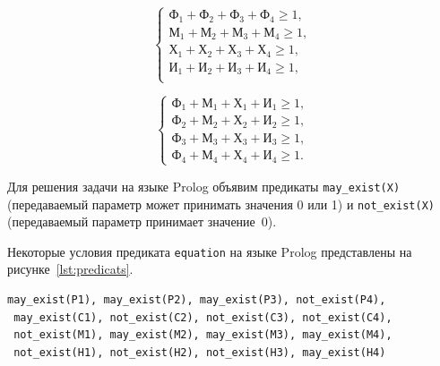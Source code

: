 \begin{minipage}[h!]{0.45\linewidth}
  \begin{equation*}
    \left\{
      \begin{aligned}
        \texttt{Ф}_1 + \texttt{Ф}_2 + \texttt{Ф}_3 + \texttt{Ф}_4 \ge 1, \\
        \texttt{М}_1 + \texttt{М}_2 + \texttt{М}_3 + \texttt{М}_4 \ge 1, \\
        \texttt{Х}_1 + \texttt{Х}_2 + \texttt{Х}_3 + \texttt{Х}_4 \ge 1, \\
        \texttt{И}_1 + \texttt{И}_2 + \texttt{И}_3 + \texttt{И}_4 \ge 1, \\
      \end{aligned}
    \right.
  \end{equation*}
\end{minipage}
\hfill
\begin{minipage}[h!]{0.45\linewidth}
  \begin{equation*}
    \left\{
      \begin{aligned}
        \texttt{Ф}_1 + \texttt{М}_1 + \texttt{Х}_1 + \texttt{И}_1 \ge 1, \\
        \texttt{Ф}_2 + \texttt{М}_2 + \texttt{Х}_2 + \texttt{И}_2 \ge 1, \\
        \texttt{Ф}_3 + \texttt{М}_3 + \texttt{Х}_3 + \texttt{И}_3 \ge 1, \\
        \texttt{Ф}_4 + \texttt{М}_4 + \texttt{Х}_4 + \texttt{И}_4 \ge 1.
      \end{aligned}
    \right.
  \end{equation*}
\end{minipage}

\vspace{7mm}

Для решения задачи на языке Prolog объявим предикаты \texttt{may\_exist(X)}
(передаваемый параметр может принимать значения 0 или 1)
и \texttt{not\_exist(X)} (передаваемый параметр принимает значение~0).

Некоторые условия предиката \texttt{equation} на языке Prolog представлены на рисунке~\ref{lst:predicats}.
\begin{lstlisting}[style=source_code,caption=Некоторые условия предиката \texttt{equation},label=lst:predicats]
 may_exist(P1), may_exist(P2), may_exist(P3), not_exist(P4),
 may_exist(C1), not_exist(C2), not_exist(C3), not_exist(C4),
 not_exist(M1), may_exist(M2), may_exist(M3), may_exist(M4),
 not_exist(H1), not_exist(H2), not_exist(H3), may_exist(H4)
\end{lstlisting}

